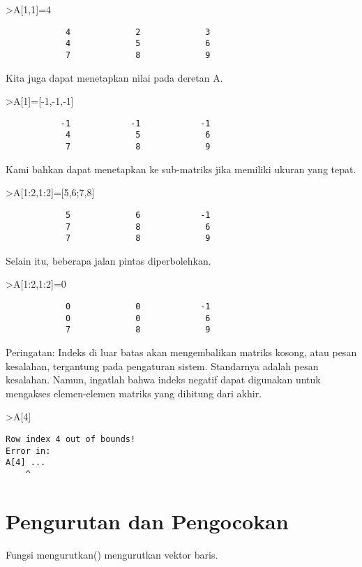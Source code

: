\documentclass[
]{book}
\begin{document}
\textgreater A{[}1,1{]}=4

\begin{verbatim}
            4             2             3 
            4             5             6 
            7             8             9 
\end{verbatim}

Kita juga dapat menetapkan nilai pada deretan A.

\textgreater A{[}1{]}={[}-1,-1,-1{]}

\begin{verbatim}
           -1            -1            -1 
            4             5             6 
            7             8             9 
\end{verbatim}

Kami bahkan dapat menetapkan ke sub-matriks jika memiliki ukuran yang tepat.

\textgreater A{[}1:2,1:2{]}={[}5,6;7,8{]}

\begin{verbatim}
            5             6            -1 
            7             8             6 
            7             8             9 
\end{verbatim}

Selain itu, beberapa jalan pintas diperbolehkan.

\textgreater A{[}1:2,1:2{]}=0

\begin{verbatim}
            0             0            -1 
            0             0             6 
            7             8             9 
\end{verbatim}

Peringatan: Indeks di luar batas akan mengembalikan matriks kosong, atau pesan kesalahan, tergantung pada pengaturan sistem. Standarnya adalah pesan kesalahan. Namun, ingatlah bahwa indeks negatif dapat digunakan untuk mengakses elemen-elemen matriks yang dihitung dari akhir.

\textgreater A{[}4{]}

\begin{verbatim}
Row index 4 out of bounds!
Error in:
A[4] ...
    ^
\end{verbatim}

\chapter{Pengurutan dan Pengocokan}\label{pengurutan-dan-pengocokan}

Fungsi mengurutkan() mengurutkan vektor baris.
\end{document}
